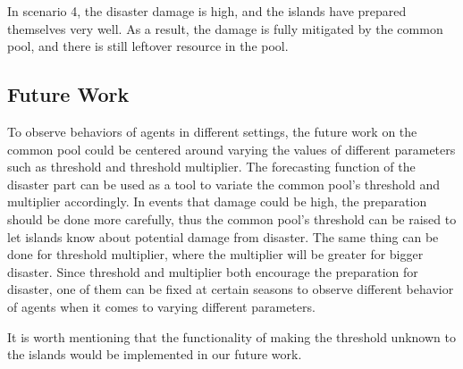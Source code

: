In scenario 4, the disaster damage is high, and the islands have prepared themselves very well. As a result, the damage is fully mitigated by the common pool, and there is still leftover resource in the pool. 


\subsection{Future Work}

To observe behaviors of agents in different settings, the future work on the common pool could be centered around varying the values of different parameters such as threshold and threshold multiplier. The forecasting function of the disaster part can be used as a tool to variate the common pool’s threshold and multiplier accordingly. In events that damage could be high, the preparation should be done more carefully, thus the common pool’s threshold can be raised to let islands know about potential damage from disaster. The same thing can be done for threshold multiplier, where the multiplier will be greater for bigger disaster. Since threshold and multiplier both encourage the preparation for disaster, one of them can be fixed at certain seasons to observe different behavior of agents when it comes to varying different parameters. 

It is worth mentioning that the functionality of making the threshold unknown to the islands would be implemented in our future work.